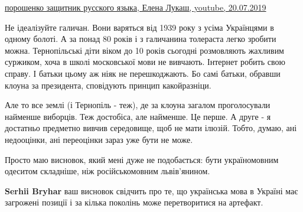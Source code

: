 \begin{itemize}
\begin{itemize}
\href{https://www.youtube.com/watch?v=awSp0bvTMqw}{%
порошенко защитник русского языка, Елена Лукаш, youtube, 20.07.2019%
}

\end{itemize}

 

Не ідеалізуйте галичан. Вони варяться від 1939 року з усіма Українцями в одному
болоті. А за понад 80 років і з галичанина толераста легко зробити можна.
Тернопільські діти віком до 10 років сьогодні розмовляють жахливим суржиком,
хоча в школі московської мови не вивчають. Інтернет робить свою справу. І
батьки цьому аж ніяк не перешкоджають. Бо самі батьки, обравши клоуна за
президента, сповідують принцип какойразніци.

\begin{itemize}
 

Але то все землі (і Тернопіль - теж), де за клоуна загалом проголосували
найменше виборців. Теж достобіса, але найменше. Це перше. А друге - я достатньо
предметно вивчив середовище, щоб не мати ілюзій. Тобто, думаю, ані недооцінки,
ані переоцінки зараз уже бути не може. 

Просто маю висновок, який мені дуже не
подобається: бути україномовним одеситом складніше, ніж російськомовним
львів'янином.


 
\textbf{Serhii Bryhar} ваш висновок свідчить про те, що українська мова в
Україні має загрожені позиції і за кілька поколінь може перетворитися на
артефакт.

 

\end{itemize}
\end{itemize}
